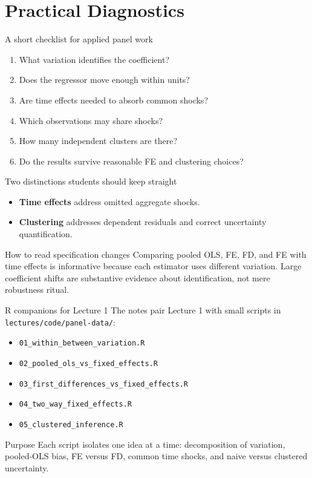 \documentclass[10pt]{beamer}
\begin{document}
\section{Practical Diagnostics}

\begin{frame}{A short checklist for applied panel work}
\label{slide:checklist}
\small
\begin{enumerate}
  \item What variation identifies the coefficient?
  \item Does the regressor move enough within units?
  \item Are time effects needed to absorb common shocks?
  \item Which observations may share shocks?
  \item How many independent clusters are there?
  \item Do the results survive reasonable FE and clustering choices?
\end{enumerate}

\pause
\begin{block}{Two distinctions students should keep straight}
\begin{itemize}
  \item \textbf{Time effects} address omitted aggregate shocks.
  \item \textbf{Clustering} addresses dependent residuals and correct uncertainty quantification.
\end{itemize}
\end{block}

\pause
\begin{exampleblock}{How to read specification changes}
Comparing pooled OLS, FE, FD, and FE with time effects is informative because each estimator uses different variation. Large coefficient shifts are substantive evidence about identification, not mere robustness ritual.
\end{exampleblock}
\end{frame}

\begin{frame}{R companions for Lecture 1}
\label{slide:rcomp}
\small
The notes pair Lecture 1 with small scripts in \texttt{lectures/code/panel-data/}:
\begin{itemize}
  \item \texttt{01\_within\_between\_variation.R}
  \item \texttt{02\_pooled\_ols\_vs\_fixed\_effects.R}
  \item \texttt{03\_first\_differences\_vs\_fixed\_effects.R}
  \item \texttt{04\_two\_way\_fixed\_effects.R}
  \item \texttt{05\_clustered\_inference.R}
\end{itemize}

\pause
\begin{block}{Purpose}
Each script isolates one idea at a time: decomposition of variation, pooled-OLS bias, FE versus FD, common time shocks, and naive versus clustered uncertainty.
\end{block}
\end{frame}
\end{document}
